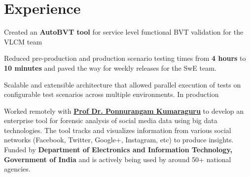 \documentclass[]{deedy-resume-openfont}
\begin{document}
%
%

%
%

\begin{minipage}[t]{0.66\textwidth} 


\section{Experience}
\vspace{\topsep} %
\begin{tightemize}
\item Created an \textbf{AutoBVT tool} for service level functional BVT validation for the VLCM team
\item Reduced pre-production and production scenario testing times from \textbf{4 hours} to \textbf{10 minutes} and paved the way for weekly releases for the SwE team.
\item
Scalable and extensible architecture that allowed parallel execution of tests on configurable test scenarios across multiple environments. In production
\end{tightemize}
\sectionsep

Worked remotely with \textbf{\href{http://precog.iiitd.edu.in/people/pk/Home.html}{Prof Dr. Ponnurangam Kumaraguru}} to develop an enterprise tool for forensic analysis of social media data using big data technologies. The tool tracks and visualizes information from various social networks (Facebook, Twitter, Google+, Instagram, etc) to produce insights. Funded by \textbf{Department of Electronics and Information Technology, Government of India} and is actively being used by around 50+ national agencies.


\end{minipage}
\end{document}
